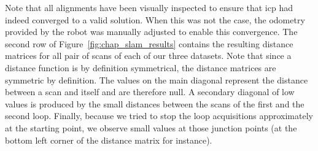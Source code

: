 Note that all alignments have been visually inspected to ensure that \gls*{icp} had indeed converged to a valid solution. When this was not the case, the odometry provided by the robot was manually adjusted to enable this convergence. The second row of Figure~\ref{fig:chap_slam_results} contains the resulting distance matrices for all pair of scans of each of our three datasets. Note that since a distance function is by definition symmetrical, the distance matrices are symmetric by definition. The values on the main diagonal represent the distance between a scan and itself and are therefore null. A secondary diagonal of low values is produced by the small distances between the scans of the first and the second loop. Finally, because we tried to stop the loop acquisitions approximately at the starting point, we observe small values at those junction points (at the bottom left corner of the distance matrix for instance).


